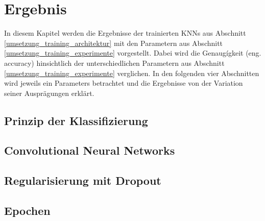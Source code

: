 

\chapter{Ergebnis}
\label{ergebnis}

In diesem Kapitel werden die Ergebnisse der trainierten \acp{KNN} aus Abschnitt \ref{umsetzung_training_architektur} mit den Parametern aus Abschnitt \ref{umsetzung_training_experimente} vorgestellt. Dabei wird die Genaugígkeit (eng. accuracy) hinsichtlich der unterschiedlichen Parametern aus Abschnitt \ref{umsetzung_training_experimente} verglichen. In den folgenden vier Abschnitten wird jeweils ein Parameters betrachtet und die Ergebnisse von der Variation seiner Ausprägungen erklärt.


\section{Prinzip der Klassifizierung}
\label{ergebnis_prinzip}




\section{Convolutional Neural Networks}
\label{ergebnis_cnn}




\section{Regularisierung mit Dropout}
\label{ergebnis_dropout}




\section{Epochen}
\label{ergebnis_epochen}













